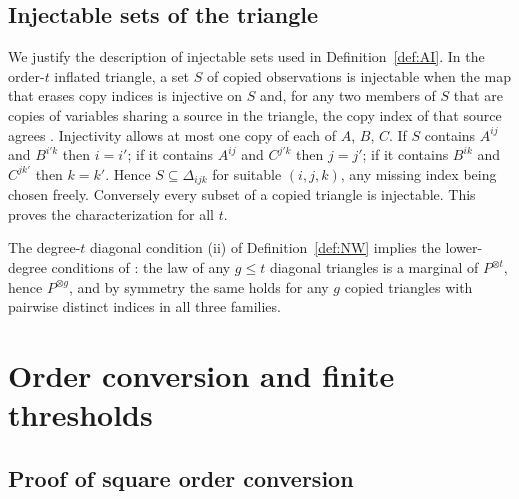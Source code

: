 \documentclass[11pt]{article}
\theoremstyle{plain}
\theoremstyle{definition}
\begin{document}
\subsection{Injectable sets of the triangle}\label{app:injectable}

We justify the description of injectable sets used in Definition~\ref{def:AI}. In the order-$t$ inflated triangle, a set $S$ of copied observations is injectable when the map that erases copy indices is injective on $S$ and, for any two members of $S$ that are copies of variables sharing a source in the triangle, the copy index of that source agrees \cite[Definition~4]{WSF2019}. Injectivity allows at most one copy of each of $A$, $B$, $C$. If $S$ contains $A^{ij}$ and $B^{i'k}$ then $i=i'$; if it contains $A^{ij}$ and $C^{j'k}$ then $j=j'$; if it contains $B^{ik}$ and $C^{jk'}$ then $k=k'$. Hence $S\subseteq\Delta_{ijk}$ for suitable $(i,j,k)$, any missing index being chosen freely. Conversely every subset of a copied triangle is injectable. This proves the characterization for all $t$.

The degree-$t$ diagonal condition (ii) of Definition~\ref{def:NW} implies the lower-degree conditions of \cite{NW2020}: the law of any $g\le t$ diagonal triangles is a marginal of $P^{\otimes t}$, hence $P^{\otimes g}$, and by symmetry the same holds for any $g$ copied triangles with pairwise distinct indices in all three families.

\section{Order conversion and finite thresholds}\label{app:quantitative}

\subsection{Proof of square order conversion}\label{app:conversion}
\end{document}
